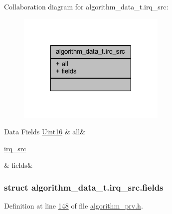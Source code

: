 Collaboration diagram for algorithm\+\_\+data\+\_\+t.\+irq\+\_\+src\+:\nopagebreak
\begin{figure}[H]
\begin{center}
\leavevmode
\includegraphics[width=201pt]{d5/dd3/a00902}
\end{center}
\end{figure}
\begin{DoxyFields}{Data Fields}
\hypertarget{a00016_aa181a603769c1f98ad927e7367c7aa51}{\hyperlink{a00072_a59a9f6be4562c327cbfb4f7e8e18f08b}{Uint16}}\label{a00016_aa181a603769c1f98ad927e7367c7aa51}
&
all&
\\
\hline

\hypertarget{a00016_ad05b6ed7d2345020440df396d6da7f73}{\hyperlink{a00016_d7/d70/a00106}{irq\+\_\+src}}\label{a00016_ad05b6ed7d2345020440df396d6da7f73}
&
fields&
\\
\hline

\end{DoxyFields}
\label{d7/d70/a00106}
\hypertarget{a00016_d7/d70/a00106}{}
\subsubsection{struct algorithm\+\_\+data\+\_\+t.\+irq\+\_\+src.\+fields}


Definition at line \hyperlink{a00016_source_l00148}{148} of file \hyperlink{a00016_source}{algorithm\+\_\+prv.\+h}.



